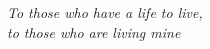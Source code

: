 \chapter*{}
\begin{flushright}
%
\textit
    {
    To those who have a life to live,\\
    to those who are living mine
    }
\end{flushright}